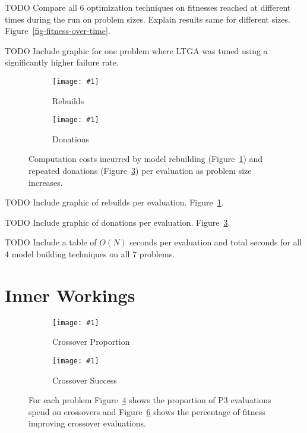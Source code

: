 \documentclass[twoside]{article}
\newcommand{\includegraphicsfit}[1]
{\texttt{[image: \#1]}}
\begin{document}
TODO Compare all 6 optimization techniques on fitnesses reached at different times
during the run on problem sizes. Explain results same for different sizes. Figure~\ref{fig-fitness-over-time}.

TODO Include graphic for one problem where LTGA was tuned using a significantly higher failure rate.

\begin{figure}[t]
  \begin{centering}
    \begin{subfigure}{.5\textwidth}
      \begin{centering}
        \includegraphicsfit{rebuilds}
      \end{centering}
      \caption{Rebuilds}
      \label{fig-rebuilds}
    \end{subfigure}%
    \begin{subfigure}{.5\textwidth}
      \begin{centering}
        \includegraphicsfit{donations}
      \end{centering}
      \caption{Donations}
      \label{fig-donations}
    \end{subfigure}
  \end{centering}
  \caption{Computation costs incurred by model rebuilding (Figure~\ref{fig-rebuilds}) and
           repeated donations (Figure~\ref{fig-donations}) per evaluation as problem size increases.}
\end{figure}

TODO Include graphic of rebuilds per evaluation. Figure~\ref{fig-rebuilds}.

TODO Include graphic of donations per evaluation. Figure~\ref{fig-donations}.

TODO Include a table of $O(N)$ seconds per evaluation and total seconds for all 4 model building techniques on all 7 problems.

\section{Inner Workings}

\begin{figure}[t]
  \begin{centering}
    \begin{subfigure}{.5\textwidth}
      \begin{centering}
        \includegraphicsfit{cross}
      \end{centering}
      \caption{Crossover Proportion}
      \label{fig-cross}
    \end{subfigure}%
    \begin{subfigure}{.5\textwidth}
      \begin{centering}
        \includegraphicsfit{cross-success}
      \end{centering}
      \caption{Crossover Success}
      \label{fig-cross-success}
    \end{subfigure}
  \end{centering}
  \caption{For each problem Figure~\ref{fig-cross} shows the proportion of P3 evaluations spend on crossovers
           and Figure~\ref{fig-cross-success} shows the percentage of fitness improving crossover evaluations.}
\end{figure}
\end{document}
